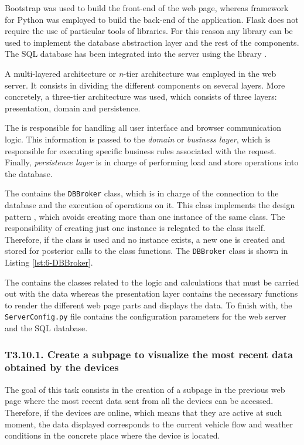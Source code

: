 Bootstrap was used to build the front-end of the web page, whereas  framework \cite{Gri14} for Python was employed to build the back-end of the application. Flask does not require the use of particular tools of libraries. For this reason any library can be used to implement the database abstraction layer and the rest of the components. The SQL database has been integrated into the server using the library  \cite{Mat16}. 

A multi-layered architecture or \textit{n}-tier architecture was employed in the web server. It consists in dividing the different components on several layers. More concretely, a three-tier architecture was used, which consists of three layers: presentation, domain and persistence.

The  is responsible for handling all user interface and browser communication logic. This information is passed to the \textit{domain} or \textit{business layer}, which is responsible for executing specific business rules associated with the request. Finally, \textit{persistence layer} is in charge of performing load and store operations into the database.

The  contains the \texttt{DBBroker} class, which is in charge of the connection to the database and the execution of operations on it. This class implements the  design pattern \cite{design_patterns, Vil07}, which avoids creating more than one instance of the same class. The responsibility of creating just one instance is relegated to the class itself. Therefore, if the class is used and no instance exists, a new one is created and stored for posterior calls to the class functions. The \texttt{DBBroker} class is shown in Listing \ref{lst:6-DBBroker}.

The  contains the classes related to the logic and calculations that must be carried out with the data whereas the presentation layer contains the necessary functions to render the different web page parts and displays the data. To finish with, the \texttt{ServerConfig.py} file contains the configuration parameters for the web server and the SQL database.




\subsubsection{T3.10.1. Create a subpage to visualize the most recent data obtained by the devices}
The goal of this task consists in the creation of a subpage in the previous web page where the most recent data sent from all the devices can be accessed. Therefore, if the devices are online, which means that they are active at such moment, the data displayed corresponds to the current vehicle flow and weather conditions in the concrete place where the device is located.

